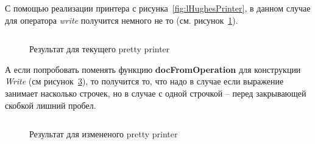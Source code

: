 С помощью реализации принтера с рисунка~\ref{fig:lHughesPrinter}, в данном случае для оператора \textit{write} получится немного не то (см. рисунок~\ref{fig:lCurWriteEx}).
\begin{figure}[h!]
	\inputminted{pascal}{codes/lCurWriteEx.l}
	\caption{Результат для текущего pretty printer}
	\label{fig:lCurWriteEx}
\end{figure}

А если попробовать поменять функцию \textbf{docFromOperation} для конструкции \textit{Write} (см рисунок~\ref{fig:lHughesWriteChange}), то получится то, что надо в случае если выражение занимает насколько строчек, но в случае с одной строчкой -- перед закрывающей скобкой лишний пробел.
\begin{figure}[h!]
	\inputminted{pascal}{codes/lBadWriteEx.l}
	\caption{Результат для измененого pretty printer}
	\label{fig:lBadWriteEx}
\end{figure}

\begin{figure}[h!]
	\inputminted{haskell}{codes/lHughesWriteChange.hs}
	\caption{}
	\label{fig:lHughesWriteChange}
\end{figure}